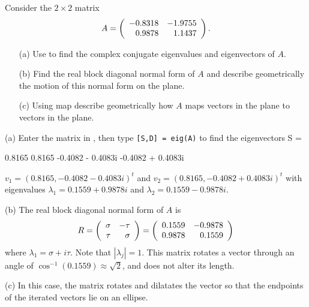 \documentclass{ximera}
\begin{document}
\begin{exercise} \label{c10.4.6}
Consider the $2\times 2$ matrix
\[
A = \left(\begin{array}{rr} -0.8318 & -1.9755\\ 0.9878 &1.1437\end{array}\right).
\]
\begin{itemize}
\item[(a)]  Use \Matlab to find the complex conjugate eigenvalues and 
eigenvectors of $A$.
\item[(b)]  Find the real block diagonal normal form of $A$ and describe
geometrically the motion of this normal form on the plane.
\item[(c)]  Using {\sf map} describe geometrically how $A$ maps vectors in 
the plane to vectors in the plane. 
\end{itemize}

\begin{solution}

(a) Enter the matrix in \Matlabp, then type {\tt [S,D] = eig(A)} to
find the eigenvectors 
S =
 
   0.8165             0.8165
  -0.4082 - 0.4083i  -0.4082 + 0.4083i

$v_1 = (0.8165, -0.4082 - 0.4083i)^t$ and
$v_2 = (0.8165, -0.4082 + 0.4083i)^t$ with eigenvalues
$\lambda_1 = 0.1559 + 0.9878i$ and $\lambda_2 = 0.1559 - 0.9878i$.

(b) The real block diagonal normal form of $A$ is
\[
R = \left(\begin{array}{rr} \sigma & -\tau\\ \tau &\sigma\end{array}\right) = \left(\begin{array}{rr} 0.1559 & -0.9878\\ 0.9878 &0.1559\end{array}\right)
\]
where $\lambda_1 = \sigma + i\tau$.  Note that $|\lambda_j|=1$.  
This matrix rotates a vector through an angle of 
$\cos^{-1}(0.1559) \approx \sqrt{2}$, and does not alter its length.  


(c) In this case, the matrix rotates and dilatates the vector so that
the endpoints of the iterated vectors lie on an ellipse.

\end{solution}
\end{exercise}
\end{document}
